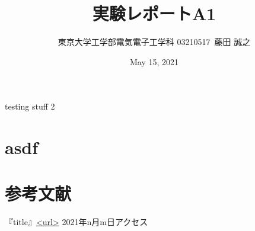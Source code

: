 \documentclass[a4j,dvipdfmx]{article}
\title{実験レポートA1}
\author{東京大学工学部電気電子工学科 03210517\ 藤田 誠之 }
\date{May 15, 2021}
\begin{document}
\maketitle

testing stuff 2

\section{asdf}

\section{参考文献}
『title』\url{<url>} 2021年n月m日アクセス
\end{document}
